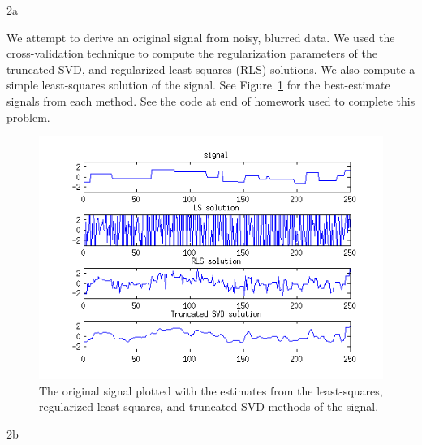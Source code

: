\documentclass{article}
\begin{document}
\begin{homeworkProblem}
    
    \begin{homeworkSection}{2a}    
    
        We attempt to derive an original signal from noisy, blurred data. We
        used the cross-validation technique to compute the regularization
        parameters of the truncated SVD, and regularized least squares (RLS)
        solutions. We also compute a simple least-squares solution of the
        signal. See Figure~\ref{fig:prob2a} for the best-estimate signals from
        each method. See the code at end of homework used to complete this
        problem.

        \begin{figure}
            
            \includegraphics[width=\linewidth]{prob2a_fig.png}

            \caption{\label{fig:prob2a} The original signal plotted with the
            estimates from the least-squares, regularized least-squares, and
        truncated SVD methods of the signal.}

        \end{figure} 
    \end{homeworkSection}
    
    \begin{homeworkSection}{2b}


\end{homeworkSection}
\end{homeworkProblem}
\end{document}
